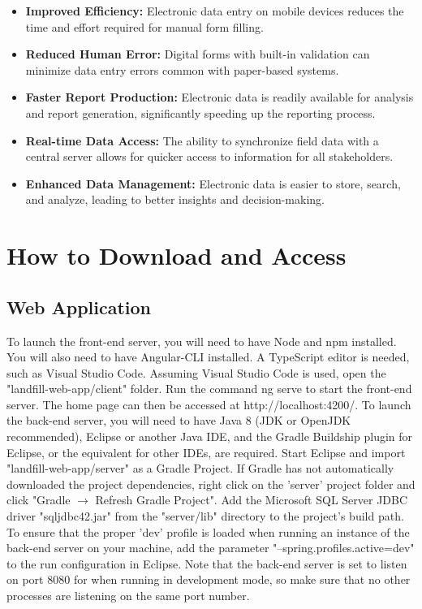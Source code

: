 \documentclass[12pt]{article}
\begin{document}
\begin{itemize}
    \item \textbf{Improved Efficiency:} Electronic data entry on mobile devices reduces the time and effort required for manual form filling.
    \item \textbf{Reduced Human Error:} Digital forms with built-in validation can minimize data entry errors common with paper-based systems.
    \item \textbf{Faster Report Production:} Electronic data is readily available for analysis and report generation, significantly speeding up the reporting process.
    \item \textbf{Real-time Data Access:} The ability to synchronize field data with a central server allows for quicker access to information for all stakeholders.
    \item \textbf{Enhanced Data Management:} Electronic data is easier to store, search, and analyze, leading to better insights and decision-making.
\end{itemize}

\newpage

\section*{How to Download and Access}
\subsection{Web Application}
To launch the front-end server, you will need to have Node and npm installed. You will also need to have Angular-CLI installed. A TypeScript editor is needed, such as Visual Studio Code.\newline
Assuming Visual Studio Code is used, open the "landfill-web-app/client" folder.  Run the command ng serve to start the front-end server. The home page can then be accessed at http://localhost:4200/.\newline \newline
To launch the back-end server, you will need to have Java 8 (JDK or OpenJDK recommended),  Eclipse or another Java IDE, and the Gradle Buildship plugin for Eclipse, or the equivalent for other IDEs, are required.\newline
Start Eclipse and import "landfill-web-app/server" as a Gradle Project. If Gradle has not automatically downloaded the project dependencies, right click on the 'server' project folder and click "Gradle $\rightarrow$ Refresh Gradle Project". Add the Microsoft SQL Server JDBC driver "sqljdbc42.jar" from the "server/lib" directory to the project's build path.\newline
To ensure that the proper 'dev' profile is loaded when running an instance of the back-end server on your machine, add the parameter "--spring.profiles.active=dev" to the run configuration in Eclipse. Note that the back-end server is set to listen on port 8080 for when running in development mode, so make sure that no other processes are listening on the same port number.
\end{document}
